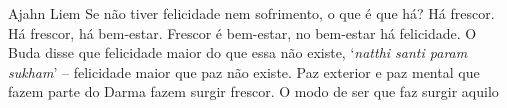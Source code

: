 
\begin{quotepage}{0.6\linewidth}{Ajahn Liem}
Se não tiver felicidade nem sofrimento, o que é que há? Há frescor. Há
frescor, há bem-estar. Frescor é bem-estar, no bem-estar há felicidade.
O Buda disse que felicidade maior do que essa não existe,
‘\textit{natthi santi param sukham}’ – felicidade maior que
paz não existe. Paz exterior e paz mental que fazem parte do Darma
fazem surgir frescor. O modo de ser que faz surgir aquilo 
\end{quotepage}

